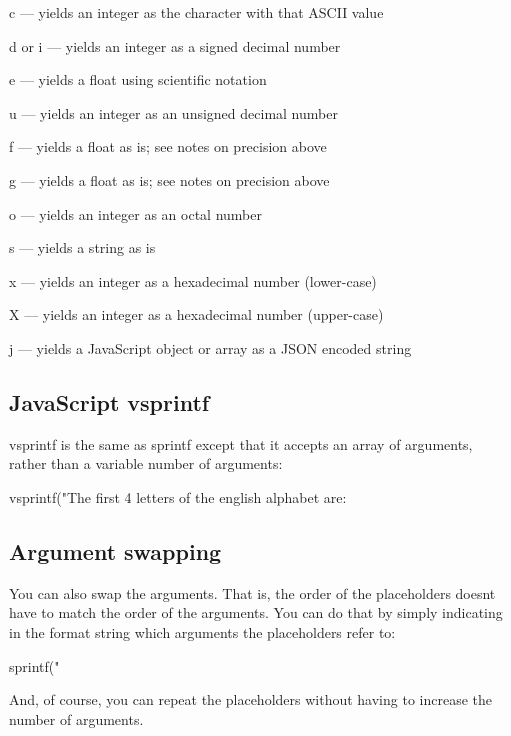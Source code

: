 \begin{DoxyItemize}
\begin{DoxyItemize}
\item {\ttfamily c} — yields an integer as the character with that A\+S\+C\+I\+I value
\item {\ttfamily d} or {\ttfamily i} — yields an integer as a signed decimal number
\item {\ttfamily e} — yields a float using scientific notation
\item {\ttfamily u} — yields an integer as an unsigned decimal number
\item {\ttfamily f} — yields a float as is; see notes on precision above
\item {\ttfamily g} — yields a float as is; see notes on precision above
\item {\ttfamily o} — yields an integer as an octal number
\item {\ttfamily s} — yields a string as is
\item {\ttfamily x} — yields an integer as a hexadecimal number (lower-\/case)
\item {\ttfamily X} — yields an integer as a hexadecimal number (upper-\/case)
\item {\ttfamily j} — yields a Java\+Script object or array as a J\+S\+O\+N encoded string
\end{DoxyItemize}
\end{DoxyItemize}

\subsection*{Java\+Script {\ttfamily vsprintf}}

{\ttfamily vsprintf} is the same as {\ttfamily sprintf} except that it accepts an array of arguments, rather than a variable number of arguments\+: \begin{DoxyVerb}vsprintf("The first 4 letters of the english alphabet are: %
\end{DoxyVerb}


\subsection*{Argument swapping}

You can also swap the arguments. That is, the order of the placeholders doesn\textquotesingle{}t have to match the order of the arguments. You can do that by simply indicating in the format string which arguments the placeholders refer to\+: \begin{DoxyVerb}sprintf("%
\end{DoxyVerb}
 And, of course, you can repeat the placeholders without having to increase the number of arguments.

